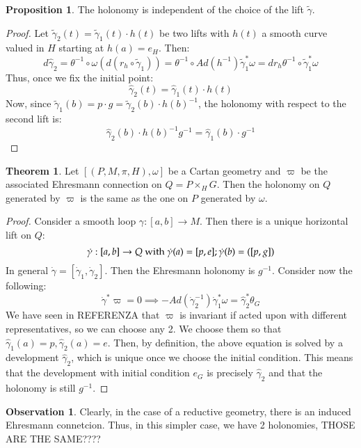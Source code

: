 \documentclass[12pt,a4paper]{report}
\theoremstyle{definition}
\theoremstyle{Theorem}
\newtheorem{Theo}[Def]{Theorem}
\newtheorem{Prop}[Def]{Proposition}
\theoremstyle{break}
\theoremstyle{definition}
\newtheorem{Obs}[Def]{Observation}
\begin{document}
	\begin{Prop}
		The holonomy is independent of the choice of the lift $\tilde{\gamma}$.
	\end{Prop}
	\begin{proof}
		Let $\tilde{\gamma}_2(t)=\tilde{\gamma}_1(t)\cdot h(t)$ be two lifts with $h(t)$ a smooth curve valued in $H$ starting at $h(a)=e_H$. Then:
		$$d\hat{\gamma}_2=\theta^{-1}\circ \omega (d(r_h\circ \tilde{\gamma}_1))=\theta^{-1}\circ Ad(h^{-1})\tilde{\gamma}_1^*\omega=dr_{h}\theta^{-1}\circ \tilde{\gamma}_1^*\omega$$
		Thus, once we fix the initial point:
		$$\hat{\gamma}_2(t)=\hat{\gamma}_1(t)\cdot h(t)$$
		Now, since $\tilde{\gamma}_1(b)=p\cdot g=\tilde{\gamma}_2(b)\cdot h(b)^{-1}$, the holonomy with respect to the second lift is:
		$$\hat{\gamma}_2(b)\cdot h(b)^{-1}g^{-1}=\hat{\gamma}_1(b)\cdot g^{-1}$$
	\end{proof}
	\begin{Theo}
		Let $[(P,M,\pi,H),\omega]$ be a Cartan geometry and $\varpi$ be the associated Ehresmann connection on $Q=P\times_H G$. Then the holonomy on $Q$ generated by $\varpi$ is the same as the one on $P$ generated by $\omega$.
	\end{Theo}
	\begin{proof}
		Consider a smooth loop $\gamma:[a,b]\rightarrow M$. Then there is a unique horizontal lift on $Q$:
		$$\dot{\gamma}:[a,b]\rightarrow Q \hbox{ with }\dot{\gamma}(a)=[p,e];\dot{\gamma}(b)=([p,g])$$
		In general $\dot{\gamma}=[\dot{\gamma}_1,\dot{\gamma}_2]$.
		Then the Ehresmann holonomy is $g^{-1}$. Consider now the following:
		$$\dot{\gamma}^*\varpi=0\implies-Ad(\dot{\gamma}_2^{-1})\dot{\gamma}_1^*\omega=\hat{\gamma}_2^*\theta_G$$
		We have seen in REFERENZA that $\varpi$ is invariant if acted upon with different representatives, so we can choose any 2. We choose them so that $\hat{\gamma}_1(a)=p,\hat{\gamma}_2(a)=e$. Then, by definition, the above equation is solved by a development $\hat{\gamma}_2$, which is unique once we choose the initial condition. This means that the development with initial condition $e_G$ is precisely $\hat{\gamma}_2$ and that the holonomy is still $g^{-1}$.
	\end{proof}
	\begin{Obs}
		Clearly, in the case of a reductive geometry, there is an induced Ehresmann connetcion. Thus, in this simpler case, we have 2 holonomies,  THOSE ARE THE SAME????
	\end{Obs}
\end{document}
